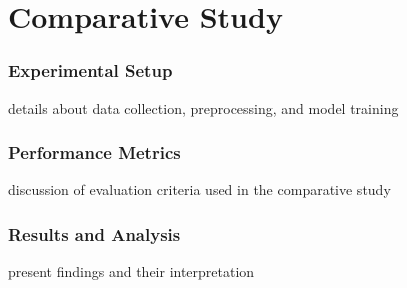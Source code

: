 \chapter{Comparative Study}
\label{ch:comparative study}

\subsection{Experimental Setup}
details about data collection, preprocessing, and model training

\subsection{Performance Metrics}
discussion of evaluation criteria used in the comparative study

\subsection{Results and Analysis}
present findings and their interpretation

